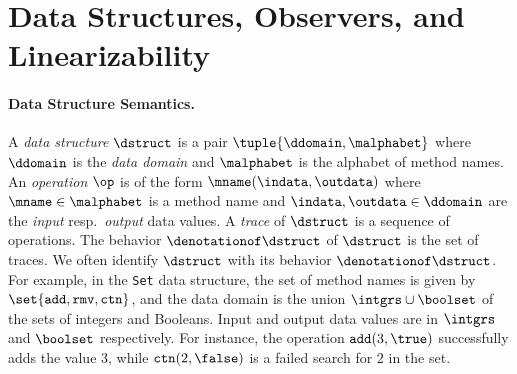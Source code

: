 \section{Data Structures, Observers, and Linearizability}
\label{linearizability:section}

\paragraph{Data Structure Semantics.}
A {\it data structure} $\dstruct$ is a pair
$\tuple{\ddomain,\malphabet}$ 
where $\ddomain$ is the {\it data domain} and 
$\malphabet$ is the alphabet of method names.
%
An {\it operation} 
$\op$ is of the form
$\mname(\indata,\outdata)$ where 
$\mname\in\malphabet$ is a method name and 
$\indata,\outdata\in\ddomain$ are the {\it input} resp.\ {\it output}
data values.
%
A {\it trace} of $\dstruct$ is a sequence of operations.
%
The behavior $\denotationof\dstruct$
of $\dstruct$ is the set of traces.
%
We often identify $\dstruct$ with its behavior $\denotationof\dstruct$.
For example, in the {\tt Set} data structure, the set of method names
is given by $\set{{\tt add}, {\tt rmv}, {\tt ctn}}$,
and the data domain is the  union $\intgrs\cup\boolset$
of the sets of integers and Booleans.
%
Input and output data values are in $\intgrs$ and $\boolset$
respectively.
%
For instance, the operation ${\tt add}(3,\true)$ successfully adds the value
$3$, while ${\tt ctn}(2,\false)$ is a failed search
for $2$ in the set.
%


